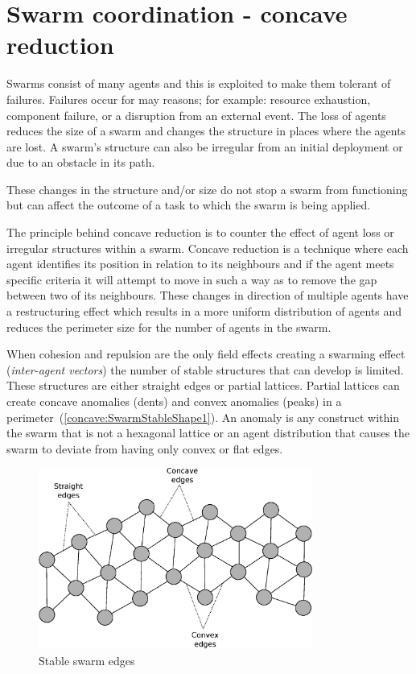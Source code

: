 \chapter{Swarm coordination - concave reduction}\label{chapter:ConcaveReduction}
Swarms consist of many agents and this is exploited to make them tolerant of failures. Failures occur for may reasons; for example: resource exhaustion, component failure, or a disruption from an external event. The loss of agents reduces the size of a swarm and changes the structure in places where the agents are lost. A swarm's structure can also be irregular from an initial deployment or due to an obstacle in its path.

These changes in the structure and/or size do not stop a swarm from functioning but can affect the outcome of a task to which the swarm is being applied. 

The principle behind concave reduction is to counter the effect of agent loss or irregular structures within a swarm. Concave reduction is a technique where each agent identifies its position in relation to its neighbours and if the agent meets specific criteria it will attempt to move in such a way as to remove the gap between two of its neighbours. These changes in direction of multiple agents have a restructuring effect which results in a more uniform distribution of agents and reduces the perimeter size for the number of agents in the swarm.
 
When cohesion and repulsion are the only field effects creating a swarming effect (\textit{inter-agent vectors}) the number of stable structures that can develop is limited. These structures are either straight edges or partial lattices. Partial lattices can create concave anomalies (dents) and convex anomalies (peaks) in a perimeter~(\autoref{concave:SwarmStableShape1}). An anomaly is any construct within the swarm that is not a hexagonal lattice or an agent distribution that causes the swarm to deviate from having only convex or flat edges. 

\begin{figure}[H]
\begin{center}
\includegraphics[width=9cm]{CHAPTER-7/figures/SwarmStableShape1}
\end{center}
\caption{Stable swarm edges\label{concave:SwarmStableShape1}}
\end{figure}

